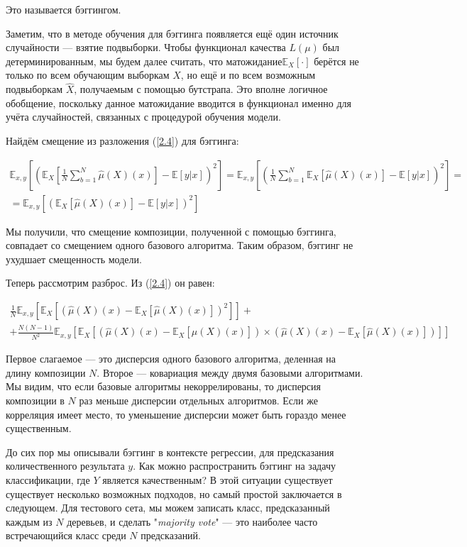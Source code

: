 \documentclass{article}
\theoremstyle{definition}
\theoremstyle{theorem}
\theoremstyle{remark}
\theoremstyle{theorem}
\theoremstyle{example}
\theoremstyle{theorem}
\theoremstyle{theorem}
\theoremstyle{theorem}
\theoremstyle{theorem}
\begin{document}
Это называется бэггингом.

Заметим, что в методе обучения для бэггинга появляется ещё один источник случайности — взятие подвыборки. Чтобы функционал качества $L(\mu)$ был детерминированным, мы будем далее считать, что матожидание$ \mathbb{E}_X [\cdot]$ берётся не только по всем обучающим выборкам $ X$, но ещё и по всем возможным подвыборкам $\hat{X}$, получаемым с помощью бутстрапа. Это вполне логичное обобщение, поскольку данное матожидание вводится в функционал именно для учёта случайностей, связанных с процедурой обучения модели.

Найдём смещение из разложения (\ref{2.4}) для бэггинга:

\begin{multline}
	\mathbb{E}_{x,y}\left[\left(\mathbb{E}_X\left[\frac{1}{N}\sum_{b=1}^{N}\hat{\mu}(X)(x)\right]-\mathbb{E}[y|x]\right)^2\right] = \mathbb{E}_{x,y}\left[\left(\frac{1}{N}\sum_{b=1}^{N}\mathbb{E}_X[\hat{\mu}(X)(x)] - \mathbb{E}[y|x]\right)^2\right] = \\ =\mathbb{E}_{x,y}\left[(\mathbb{E}_X\left[\hat{\mu}(X)(x)\right]-\mathbb{E}[y|x])^2\right]
\end{multline}


Мы получили, что смещение композиции, полученной с помощью бэггинга, совпадает со смещением одного базового алгоритма. Таким образом, бэггинг не ухудшает смещенность модели.

Теперь рассмотрим разброс. Из (\ref{2.4}) он равен:

\begin{multline}
	\frac{1}{N}\mathbb{E}_{x,y}\left[\mathbb{E}_X\left[\left(\hat{\mu}(X)(x)-\mathbb{E}_X[\hat{\mu}(X)(x)]\right)^2\right]\right] + \\ + 
	\frac{N(N-1)}{N^2}\mathbb{E}_{x,y}\left[\mathbb{E}_X\left[\left(\hat{\mu}(X)(x)-\mathbb{E}_X[\hat{\mu}(X)(x)]\right)\times \left(\hat{\mu}(X)(x)-\mathbb{E}_X[\hat{\mu}(X)(x)]\right)\right]\right]
\end{multline}

Первое слагаемое — это дисперсия одного базового алгоритма, деленная на длину композиции $N.$ Второе --- ковариация между двумя базовыми алгоритмами. Мы видим, что если базовые алгоритмы некоррелированы, то дисперсия композиции в $N$ раз меньше дисперсии отдельных алгоритмов. Если же корреляция имеет место, то уменьшение дисперсии может быть гораздо менее существенным.

До сих пор мы описывали бэггинг в контексте регрессии, для предсказания количественного результата $y$. Как можно распространить бэггинг на задачу классификации, где $Y$ является качественным? В этой ситуации существует существует несколько возможных подходов, но самый простой заключается в следующем. Для тестового сета, мы можем записать класс, предсказанный каждым из $N$ деревьев, и сделать "\textit{majority vote}" --- это наиболее часто встречающийся класс среди $N$ предсказаний.
\end{document}
